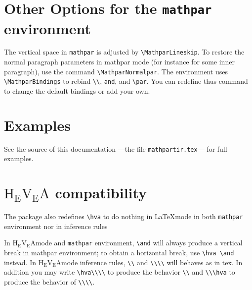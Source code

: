\documentclass {article}
\def \L#1{\lower 0.4ex \hbox {#1}}
\def \R#1{\raise 0.4ex \hbox {#1}}
\def \hevea {H\L{E}\R{V}\L{E}A}
\def \hevea {$\mbox {H}\!_{\mbox {E}}\!\mbox {V}\!_{\mbox {E}}\!\mbox {A}$}
\let \lst \verb
\begin{document}
\section {Other Options for the {\tt mathpar} environment}

The vertical space in \verb"mathpar" is adjusted by
\verb"\MathparLineskip". To restore the normal paragraph parameters in mathpar
mode (for instance for some inner paragraph), use the command
\verb"\MathparNormalpar".
The environment uses \verb"\MathparBindings" to
rebind \verb"\\", \verb"and", and \verb"\par". You can redefine thus command
to change the default bindings or add your own.


\section {Examples}

See the source of this documentation ---the file \lst"mathpartir.tex"---
for full examples.

\section {{\hevea} compatibility}

The package also redefines \verb"\hva" to do nothing in \LaTeX mode in
both \lst"mathpar" environment nor in inference rules

In \hevea mode and \verb"mathpar" environment, \verb"\and" will always
produce a vertical break in mathpar environment; to obtain a horizontal
break, use \verb"\hva \and" instead.
In \hevea mode inference rules, \verb"\\" and \verb"\\\\"
will behaves as in tex.  In addition you may write \verb"\hva\\\\" to
produce the behavior \verb"\\" and \verb"\\\hva" to produce the behavior of
\verb"\\\\".
\end{document}
